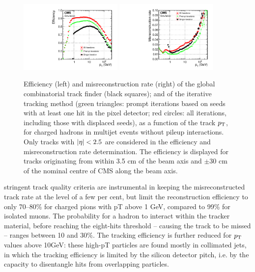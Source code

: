 \begin{figure}[htbp]
\centering
     \includegraphics[width=0.45\textwidth]{object_reconstruction_and_selection/plots/pf_track_eff.pdf}
     \includegraphics[width=0.45\textwidth]{object_reconstruction_and_selection/plots/pf_track_misId.pdf}
     \caption{
Efficiency (left) and misreconstruction rate (right) of the global combinatorial track finder (black squares); 
and of the iterative tracking method (green triangles: prompt iterations based on seeds with at least one 
hit in the pixel detector; red circles: all iterations, including those with displaced seeds), as a function 
of the track $p_\mathrm{T}$, for charged hadrons in multijet events without pileup interactions. Only tracks with 
$\lvert\eta\rvert < 2.5$ are considered in the efficiency and misreconstruction rate determination. The efficiency 
is displayed for tracks originating from within 3.5 cm of the beam axis and $\pm$30 cm of the nominal 
centre of CMS along the beam axis.
     }
     \label{fig:cms_slice}
\end{figure}

stringent track quality criteria are instrumental in keeping the misreconstructed track rate at the level of a few per cent, but limit the reconstruction efficiency to only 70–80\% for charged pions with pT above 1 GeV, compared to 99\% for isolated muons.
The probability for a hadron to interact within the tracker material, before reaching the eight-hits threshold 
-- causing the track to be missed -- ranges between 10 and 30\%. The tracking efficiency is further 
reduced for $p_\mathrm{T}$ values above 10GeV: these high-pT particles are found mostly in collimated jets, in 
which the tracking efficiency is limited by the silicon detector pitch, i.e. by the capacity to 
disentangle hits from overlapping particles.

